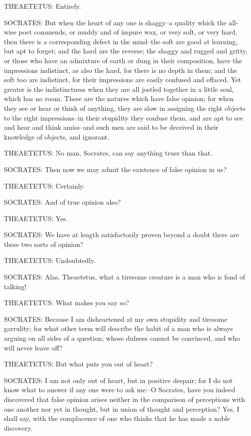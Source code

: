 THEAETETUS: Entirely.

SOCRATES: But when the heart of any one is shaggy--a quality which the
all-wise poet commends, or muddy and of impure wax, or very soft, or
very hard, then there is a corresponding defect in the mind--the soft
are good at learning, but apt to forget; and the hard are the reverse;
the shaggy and rugged and gritty, or those who have an admixture of
earth or dung in their composition, have the impressions indistinct,
as also the hard, for there is no depth in them; and the soft too are
indistinct, for their impressions are easily confused and effaced. Yet
greater is the indistinctness when they are all jostled together in a
little soul, which has no room. These are the natures which have false
opinion; for when they see or hear or think of anything, they are
slow in assigning the right objects to the right impressions--in their
stupidity they confuse them, and are apt to see and hear and think
amiss--and such men are said to be deceived in their knowledge of
objects, and ignorant.

THEAETETUS: No man, Socrates, can say anything truer than that.

SOCRATES: Then now we may admit the existence of false opinion in us?

THEAETETUS: Certainly.

SOCRATES: And of true opinion also?

THEAETETUS: Yes.

SOCRATES: We have at length satisfactorily proven beyond a doubt there
are these two sorts of opinion?

THEAETETUS: Undoubtedly.

SOCRATES: Alas, Theaetetus, what a tiresome creature is a man who is
fond of talking!

THEAETETUS: What makes you say so?

SOCRATES: Because I am disheartened at my own stupidity and tiresome
garrulity; for what other term will describe the habit of a man who
is always arguing on all sides of a question; whose dulness cannot be
convinced, and who will never leave off?

THEAETETUS: But what puts you out of heart?

SOCRATES: I am not only out of heart, but in positive despair; for I do
not know what to answer if any one were to ask me:--O Socrates, have you
indeed discovered that false opinion arises neither in the comparison of
perceptions with one another nor yet in thought, but in union of thought
and perception? Yes, I shall say, with the complacence of one who thinks
that he has made a noble discovery.

